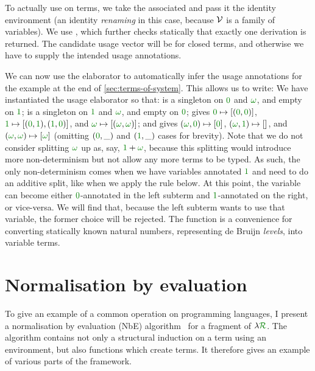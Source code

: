 
To actually use  on terms, we take the associated
 and pass it the identity environment (an identity
\emph{renaming} in this case, because $\mathcal V$ is a family of variables).
We use , which further
checks statically that exactly one derivation is returned.
The candidate usage vector  will be \AgdaFunction{[]} for closed
terms, and otherwise we have to supply the intended usage annotations.

We can now use the elaborator to automatically infer the usage
annotations for the example at the end of \cref{sec:terms-of-system}.
This allows us to write:
We have instantiated the usage elaborator so that:
 is a singleton on $\gr0$ and $\gr\omega$, and
empty on $\gr1$;  is a singleton on $\gr1$ and
$\gr\omega$, and empty on $\gr0$;  gives $\gr0
\mapsto [(\gr0,\gr0)]$, $\gr1 \mapsto [(\gr0,\gr1),(\gr1,\gr0)]$, and
$\gr\omega \mapsto [(\gr\omega,\gr\omega)]$; and 
gives $(\gr\omega, \gr0) \mapsto [\gr0]$, $(\gr\omega, \gr1) \mapsto
[]$, and $(\gr\omega, \gr\omega) \mapsto [\gr\omega]$ (omitting
$(\gr0, \_)$ and $(\gr1, \_)$ cases for brevity). Note that we do not
consider splitting $\gr\omega$ up as, say, $\gr1 + \gr\omega$, because
this splitting would introduce more non-determinism but not allow any
more terms to be typed. As such, the only non-determinism comes when
we have variables annotated $\gr1$ and need to do an additive split,
like when we apply the  rule below. At
this point, the variable can become either $\gr0$-annotated in the
left subterm and $\gr1$-annotated on the right, or vice-versa. We will
find that, because the left subterm wants to use that variable, the
former choice will be rejected. The function  is a
convenience for converting statically known natural numbers,
representing de Bruijn \emph{levels}, into variable terms.


\section{Normalisation by evaluation}\label{sec:nbe}

To give an example of a common operation on programming languages, I present a
normalisation by evaluation (NbE) algorithm~\citep{BS91} for a fragment of
$\name$.
The algorithm contains not only a structural induction on a term using an
environment, but also functions which create terms.
It therefore gives an example of various parts of the framework.

